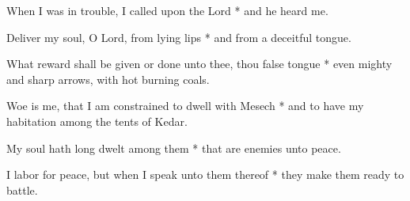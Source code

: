 \begin{multicols}{2}
	
	When I was in trouble, I called upon the Lord * and he heard me.
	
	Deliver my soul, O Lord, from lying lips * and from a deceitful tongue.
	
	What reward shall be given or done unto thee, thou false tongue * even mighty and sharp arrows, with hot burning coals.
	
	Woe is me, that I am constrained to dwell with Mesech * and to have my habitation among the tents of Kedar.
	
	My soul hath long dwelt among them * that are enemies unto peace.
	
	I labor for peace, but when I speak unto them thereof * they make them ready to battle.
	
	\gloria{}
\end{multicols}